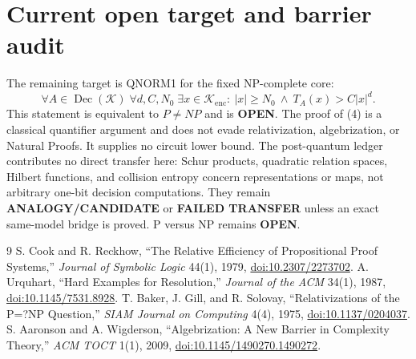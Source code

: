 \documentclass[11pt]{article}
\begin{document}
\section{Current open target and barrier audit}
The remaining target is QNORM1 for the fixed NP-complete core:
\[
 \forall A\in\operatorname{Dec}(\mathcal K)\;\forall d,C,N_0\;
 \exists x\in\mathcal K_{\mathrm{enc}}:\ |x|\ge N_0\ \wedge\
 T_A(x)>C|x|^d.                                             \tag{7}
\]
This statement is equivalent to $P\ne NP$ and is \textbf{OPEN}.  The proof
of (4) is a classical quantifier argument and does not evade relativization,
algebrization, or Natural Proofs.  It supplies no circuit lower bound.  The
post-quantum ledger contributes no direct transfer here: Schur products,
quadratic relation spaces, Hilbert functions, and collision entropy concern
representations or maps, not arbitrary one-bit decision computations.  They
remain \textbf{ANALOGY/CANDIDATE} or \textbf{FAILED TRANSFER} unless an exact
same-model bridge is proved.  P versus NP remains \textbf{OPEN}.

\begin{thebibliography}{9}
S. Cook and R. Reckhow, ``The Relative Efficiency of Propositional Proof
Systems,'' \emph{Journal of Symbolic Logic} 44(1), 1979,
\href{https://doi.org/10.2307/2273702}{doi:10.2307/2273702}.
A. Urquhart, ``Hard Examples for Resolution,'' \emph{Journal of the ACM}
34(1), 1987, \href{https://doi.org/10.1145/7531.8928}{doi:10.1145/7531.8928}.
\bibitem{BakerGillSolovay1975}
T. Baker, J. Gill, and R. Solovay, ``Relativizations of the P=?NP Question,''
\emph{SIAM Journal on Computing} 4(4), 1975,
\href{https://doi.org/10.1137/0204037}{doi:10.1137/0204037}.
S. Aaronson and A. Wigderson, ``Algebrization: A New Barrier in Complexity
Theory,'' \emph{ACM TOCT} 1(1), 2009,
\href{https://doi.org/10.1145/1490270.1490272}{doi:10.1145/1490270.1490272}.
\end{thebibliography}

\end{document}
